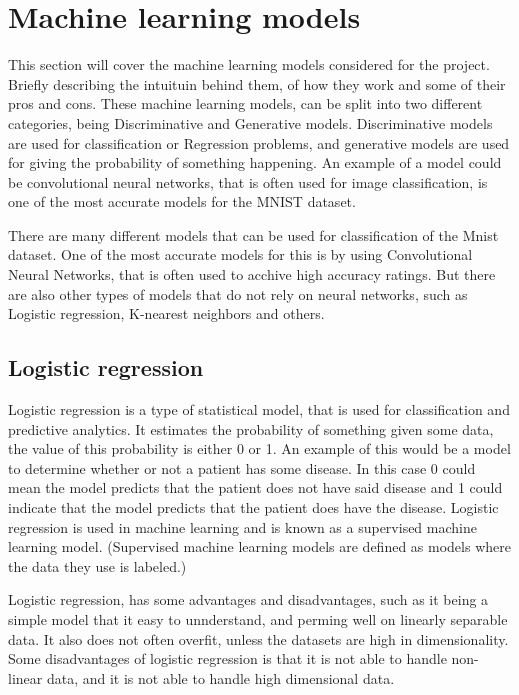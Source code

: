 \section{Machine learning models}\label{sec:machine-learning-models}
This section will cover the machine learning models considered for the project. Briefly describing the intuituin behind them, of how they work and some of their pros and cons. These machine learning models, can be split into two different categories, being Discriminative and Generative models. Discriminative models are used for classification or Regression problems, and generative models are used for giving the probability of something happening. An example of a model could be convolutional neural networks, that is often used for image classification, is one of the most accurate models for the MNIST dataset.


There are many different models that can be used for classification of the Mnist dataset. One of the most accurate models for this is by using Convolutional Neural Networks, that is often used to acchive high accuracy ratings. But there are also other types of models that do not rely on neural networks, such as Logistic regression, K-nearest neighbors and others. 

\subsection{Logistic regression}
Logistic regression is a type of statistical model, that is used for classification and predictive analytics. It estimates the probability of something given some data, the value of this probability is either 0 or 1. An example of this would be a model to determine whether or not a patient has some disease. In this case 0 could mean the model predicts that the patient does not have said disease and 1 could indicate that the model predicts that the patient does have the disease. Logistic regression is used in machine learning and is known as a supervised machine learning model. (Supervised machine learning models are defined as models where the data they use is labeled.) 

Logistic regression, has some advantages and disadvantages, such as it being a simple model that it easy to unnderstand, and perming well on linearly separable data. It also does not often overfit, unless the datasets are high in dimensionality. Some disadvantages of logistic regression is that it is not able to handle non-linear data, and it is not able to handle high dimensional data.

